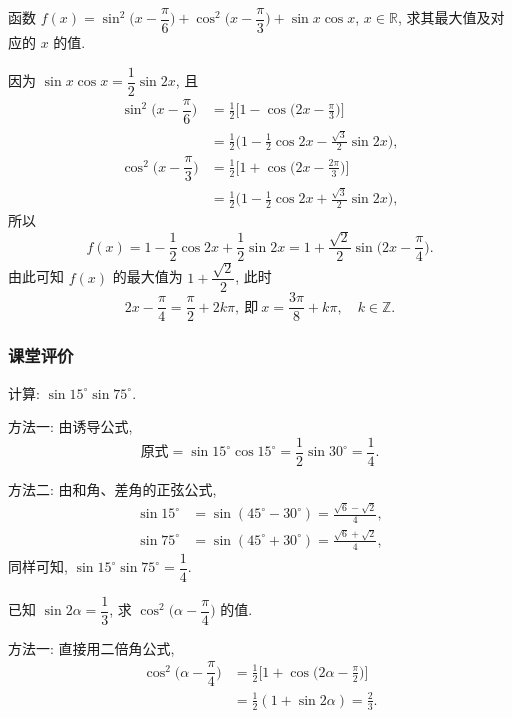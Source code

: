 \lianxi
\begin{exercise}[s]
    函数 $f(x)=\sin^2\Big(x-\dfrac\pi6\Big)+ \cos^2\Big(x-\dfrac\pi3\Big) + \sin x\cos x$, $x\in\mathbb{R}$, 求其最大值及对应的 $x$ 的值.
\end{exercise}
\beginsolution
    因为 $\sin x\cos x= \dfrac12\sin2x$, 且
    \[\begin{aligned}
        \sin^2\Big(x-\dfrac\pi6\Big)
        &= \frac12\biggl[1- \cos\biggl(2x- \frac\pi3\biggr)\biggr]\\
        &= \frac12\biggl(1- \frac12\cos2x- \frac{\sqrt3}2\sin2x\biggr),\\
        \cos^2\Big(x-\dfrac\pi3\Big)
        &= \frac12\biggl[1+ \cos\biggl(2x- \frac{2\pi}3\biggr)\biggr]\\
        &= \frac12\biggl(1- \frac12\cos2x+ \frac{\sqrt3}2\sin2x\biggr),
    \end{aligned}\]
    所以
    \[f(x)= 1- \frac12\cos2x+ \frac12\sin2x
        = 1+ \frac{\sqrt2}{2}\sin\biggl(2x- \frac\pi4\biggr).\]
    由此可知 $f(x)$ 的最大值为 $1+\dfrac{\sqrt2}2$, 此时
    \[2x- \dfrac\pi4= \dfrac\pi2+ 2k\pi,\ \text{即}\ 
        x= \dfrac{3\pi}8+ k\pi,\quad k\in\mathbb{Z}.\]
\endsolution

\subsubsection{课堂评价}

\begin{exercise}
    计算: $\sin 15^\circ\sin 75^\circ$.
\end{exercise}
\beginsolution
    方法一: 由诱导公式, 
    \[\text{原式}= \sin 15^\circ\cos 15^\circ
        = \frac12\sin 30^\circ= \frac14.\]
    
    方法二: 由和角、差角的正弦公式,
    \[\begin{aligned}
        \sin 15^\circ&= \sin(45^\circ- 30^\circ)
            = \frac{\sqrt6-\sqrt2}{4},\\
        \sin 75^\circ&= \sin(45^\circ+ 30^\circ)
        = \frac{\sqrt6+\sqrt2}{4},
    \end{aligned}\]
    同样可知, $\sin 15^\circ\sin 75^\circ= \dfrac14$.
\endsolution

\begin{exercise}
    已知 $\sin2\alpha=\dfrac13$, 求 $\cos^2\Big(\alpha- \dfrac\pi4\Big)$ 的值.
\end{exercise}
\beginsolution
    方法一: 直接用二倍角公式,
    \[\begin{aligned}
        \cos^2\Big(\alpha- \dfrac\pi4\Big)
        &= \frac12\biggl[1+ \cos\biggl(2\alpha- \frac\pi2\biggr)\biggr]\\
        &= \frac12(1+ \sin2\alpha)
         = \frac23.
    \end{aligned}\]

